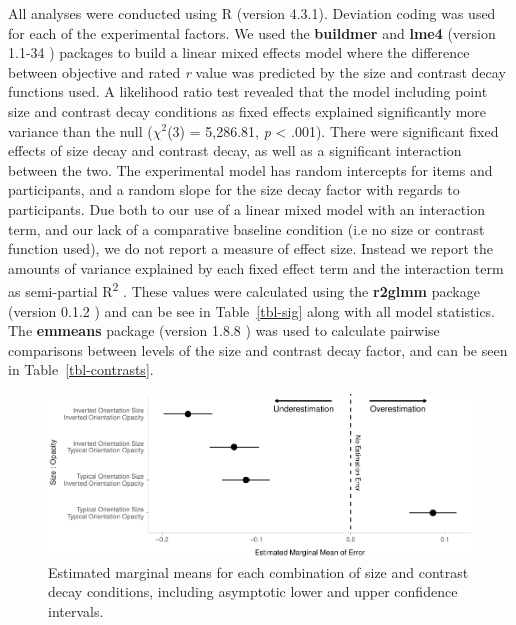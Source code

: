 \documentclass[manuscript, review, anonymous, screen]{acmart}
\begin{document}
All analyses were conducted using R (version 4.3.1). Deviation coding
was used for each of the experimental factors. We used the
\textbf{buildmer} and \textbf{lme4} (version 1.1-34 \citep{lme4})
packages to build a linear mixed effects model where the difference
between objective and rated \emph{r} value was predicted by the size and
contrast decay functions used. A likelihood ratio test revealed that the
model including point size and contrast decay conditions as fixed
effects explained significantly more variance than the null
(\(\chi^2\)(3) = 5,286.81, \emph{p} \textless{} .001). There were
significant fixed effects of size decay and contrast decay, as well as a
significant interaction between the two. The experimental model has
random intercepts for items and participants, and a random slope for the
size decay factor with regards to participants. Due both to our use of a
linear mixed model with an interaction term, and our lack of a
comparative baseline condition (i.e no size or contrast function used),
we do not report a measure of effect size. Instead we report the amounts
of variance explained by each fixed effect term and the interaction term
as semi-partial R\textsuperscript{2} \citep{nakagawa_2013}. These values
were calculated using the \textbf{r2glmm} package (version 0.1.2
\citep{r2glmm}) and can be see in Table~\ref{tbl-sig} along with all
model statistics. The \textbf{emmeans} package (version 1.8.8
\citep{emmeans}) was used to calculate pairwise comparisons between
levels of the size and contrast decay factor, and can be seen in
Table~\ref{tbl-contrasts}.

\begin{figure}

{\centering \includegraphics[width=1\textwidth,height=\textheight]{size_and_opacity_files/figure-pdf/fig-emm-plot-1.pdf}

}

\caption{\label{fig-emm-plot}Estimated marginal means for each
combination of size and contrast decay conditions, including asymptotic
lower and upper confidence intervals.}

\end{figure}
\end{document}
